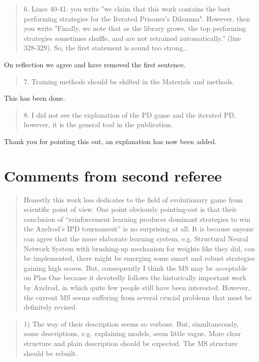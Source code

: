 \documentclass[a4]{article}
\begin{document}
\begin{quote}
    6. Lines 40-41: you write "we claim that this work contains the best
    performing strategies for the Iterated Prisoner's Dilemma". However, then
    you write "Finally, we note that as the library grows, the top performing
    strategies sometimes shuffle, and are not retrained automatically." (line
    328-329). So, the first statement is sound too strong...
\end{quote}

On reflection we agree and have removed the first sentence.

\begin{quote}
    7. Training methods should be shifted in the Materials and methods.
\end{quote}

This has been done.

\begin{quote}
    8. I did not see the explanation of the PD game and the iterated PD,
    however, it is the general tool in the publication.
\end{quote}

Thank you for pointing this out, an explanation has now been added.

\section{Comments from second referee}

\begin{quote}
Honestly this work less dedicates to the field of evolutionary game from
scientific point of view. One point obviously pointing-out is that their
conclusion of “reinforcement learning produces dominant strategies to win the
Axelrod’s IPD tournament” is no surprising at all. It is because anyone can
agree that the more elaborate learning system, e.g. Structural Neural Network
System with brushing-up mechanism for weights like they did, can be
implemented, there might be emerging some smart and robust strategies gaining
high scores.  But, consequently I think the MS may be acceptable on Plos One
because it devotedly follows the historically important work by Axelrod, in
which quite few people still have been interested. However, the current MS
seems suffering from several crucial problems that must be definitely revised.
\end{quote}

\begin{quote}
1) The way of their description seems so verbose. But, simultaneously, some
descriptions, e.g. explaining models, seem little vague. More clear structure
and plain description should be expected. The MS structure should be rebuilt.
\end{quote}
\end{document}

